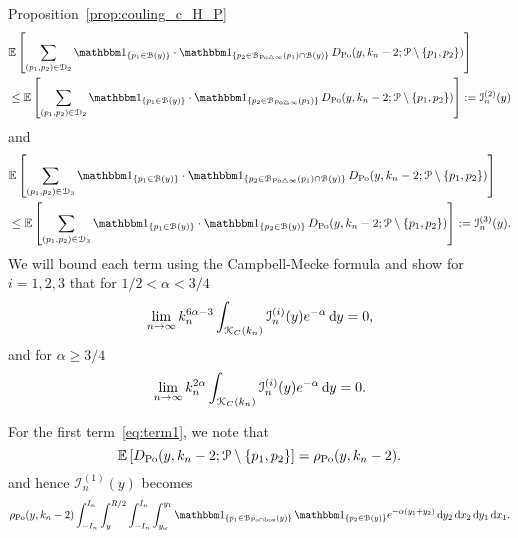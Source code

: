 \begin{proofof}{Proposition~\ref{prop:couling_c_H_P}}
\begin{equation} \label{eq:term2}
\begin{split}
	&\Exp{\sum_{(p_1, p_2)\in \dom{2}} \ind{p_1 \in \BallHyp{y}} \cdot \ind{p_2 \in \BallSym{p_1}\cap \BallHyp{y}} 
		\, D_{\Po} (y,k_n-2;\Pcal \setminus \{p_1,p_2\})} \\
	&\le \Exp{\sum_{(p_1, p_2)\in \dom{2}} \ind{p_1 \in \BallHyp{y}} \cdot \ind{p_2 \in \BallSym{p_1}} 
		\, D_{\Po} (y,k_n-2;\Pcal \setminus \{p_1,p_2\})} := \mathcal{I}_n^{(2)}(y)
\end{split}
\end{equation}
and 
\begin{equation}\label{eq:term3}
\begin{split}
	&\Exp{\sum_{(p_1, p_2)\in \dom{3}} \ind{p_1 \in \BallHyp{y}} \cdot \ind{p_2 \in \BallSym{p_1}\cap \BallHyp{y}} 
		\, D_{\Po} (y,k_n-2;\Pcal \setminus \{p_1,p_2\})} \\
	&\le \Exp{\sum_{(p_1, p_2)\in \dom{3}} \ind{p_1 \in \BallHyp{y}} \cdot \ind{p_2 \in \BallHyp{y}} 
		\, D_{\Po} (y,k_n-2;\Pcal \setminus \{p_1,p_2\})} := \mathcal{I}_n^{(3)}(y).
\end{split}
\end{equation}
We will bound each term using the Campbell-Mecke formula and show for $i = 1,2,3$ that for $1/2 < \alpha < 3/4$
\begin{equation}
	\lim_{n \to \infty} k_n^{6\alpha -3} 
		\int_{{\mathcal K}_{C}(k_n)} \mathcal{I}_n^{(i)}(y) e^{-\alpha} \operatorname{\mathrm{d}\hspace{-2pt}} y = 0,
\end{equation}
and for $\alpha \ge 3/4$
\begin{equation}
	\lim_{n \to \infty} k_n^{2\alpha}
		\int_{{\mathcal K}_{C}(k_n)} \mathcal{I}_n^{(i)}(y) e^{-\alpha} \operatorname{\mathrm{d}\hspace{-2pt}} y = 0.
\end{equation}

For the first term~\eqref{eq:term1}, we note that
\[ 
\mathbb{E}\left[D_{{\mathrm{Po}}}(y, k_n-2;{\mathcal P} \setminus \{p_1, p_2\}\right] =\rho_{{\mathrm{Po}}}(y,k_n-2).
\] 
and hence $\mathcal{I}_n^{(1)}(y)$ becomes
\begin{equation} \label{eq:1sum-expansion} 
\begin{split}
	\rho_{\Po}(y,k_n-2) \int_{-I_n}^{I_n} \int_y^{R/2}\int_{-I_n}^{I_n} \int_{y_\omega}^{y_1}
  	\ind{p_1 \in \BallInter{y}} \, \ind{p_2 \in \BallHyp{y}} 
  	e^{-\alpha (y_1 + y_2)} \dd y_2 \dd x_2 \dd y_1 \dd x_1.
\end{split}
\end{equation}


\end{proofof}
